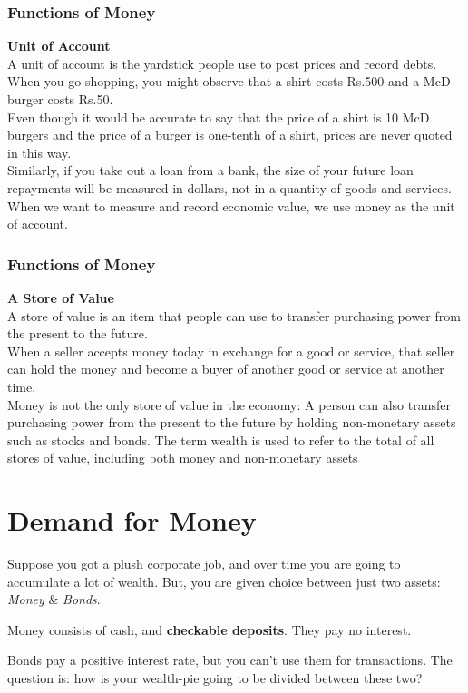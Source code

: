 \documentclass[shownotes,11pt, aspectratio=169]{beamer}
\newenvironment{wideitemize}{\itemize\addtolength{\itemsep}{10pt}}{\enditemize}
\begin{document}
\begin{frame}
\frametitle{Functions of Money}
\textbf{Unit of Account} \\
\vspace{3mm}
A unit of account is the yardstick people use to post prices and record debts. \\
\vspace{3mm}
When you go shopping, you might observe that a shirt costs Rs.500 and a McD burger
costs Rs.50. \\
\vspace{3mm}
Even though it would be accurate to say that the price of a shirt is 10 McD burgers
and the price of a burger is one-tenth of a shirt, prices are never quoted in
this way.  \\
\vspace{3mm}
Similarly, if you take out a loan from a bank, the size of your future loan
repayments will be measured in dollars, not in a quantity of goods and services.
When we want to measure and record economic value, we use money as the unit
of account.
\end{frame}

\begin{frame}
\frametitle{Functions of Money}
\textbf{A Store of Value} \\
\vspace{3mm}
A store of value is an item that people can use to transfer purchasing power
from the present to the future. \\
\vspace{3mm}
When a seller accepts money today in exchange for a
good or service, that seller can hold the money and become a buyer of another good
or service at another time. \\
\vspace{3mm}
Money is not the only store of value in the economy: A
person can also transfer purchasing power from the present to the future by holding
non-monetary assets such as stocks and bonds. The term wealth is used to refer
to the total of all stores of value, including both money and non-monetary assets
\end{frame}

\section{Demand for Money}
\begin{frame}
Suppose you got a plush corporate job, and over time you are going to accumulate a lot of wealth. But, you are given choice between just two assets: \textit{Money} \& \textit{Bonds}.
\pause
\vspace{5mm}
\begin{wideitemize}
\item Money consists of cash, and \textbf{checkable deposits}. \pause They pay no interest. \pause
\item Bonds pay a positive interest rate, but you can't use them for transactions.
\end{wideitemize}
\pause
\vspace{5mm}
\textcolor{green!90}{The question is: how is your wealth-pie going to be divided between these two?}
\end{frame}
\end{document}

